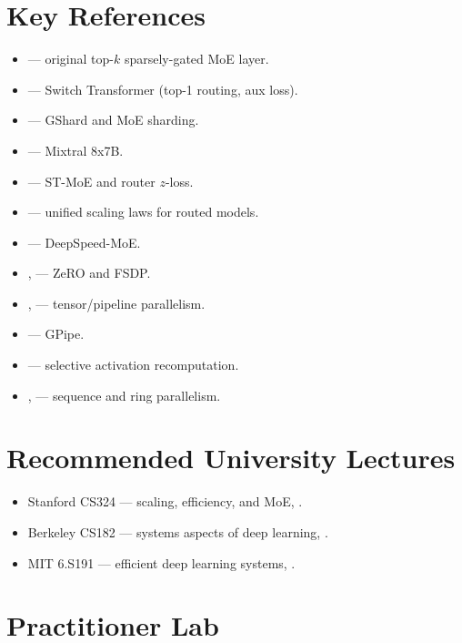 \section{Key References}

\begin{itemize}
  \item \citet{shazeer2017outrageously} --- original top-$k$
        sparsely-gated MoE layer.
  \item \citet{fedus2021switch} --- Switch Transformer (top-1
        routing, aux loss).
  \item \citet{lepikhin2021gshard} --- GShard and MoE sharding.
  \item \citet{jiang2024mixtral} --- Mixtral 8x7B.
  \item \citet{zoph2022stmoe} --- ST-MoE and router $z$-loss.
  \item \citet{clark2022unified} --- unified scaling laws for routed
        models.
  \item \citet{rajbhandari2022deepspeedmoe} --- DeepSpeed-MoE.
  \item \citet{rajbhandari2020zero}, \citet{zhao2023fsdp} --- ZeRO
        and FSDP.
  \item \citet{shoeybi2019megatron}, \citet{narayanan2021efficient}
        --- tensor/pipeline parallelism.
  \item \citet{huang2019gpipe} --- GPipe.
  \item \citet{korthikanti2023reducing} --- selective activation
        recomputation.
  \item \citet{li2023sequence}, \citet{liu2023ringattention} ---
        sequence and ring parallelism.
\end{itemize}

\section{Recommended University Lectures}

\begin{itemize}
  \item Stanford CS324 --- scaling, efficiency, and MoE,
        \citet{stanford_cs324}.
  \item Berkeley CS182 --- systems aspects of deep learning,
        \citet{berkeley_cs182}.
  \item MIT 6.S191 --- efficient deep learning systems,
        \citet{mit_6s191}.
\end{itemize}

\section{Practitioner Lab}

